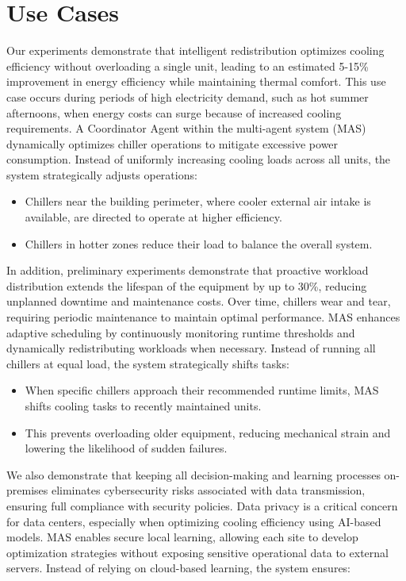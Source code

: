 \documentclass{svproc}
\begin{document}
\section{Use Cases}
\label{sec:use-cases}

Our experiments demonstrate that intelligent redistribution optimizes cooling efficiency without overloading a single unit, leading to an estimated 5-15\% improvement in energy efficiency while maintaining thermal comfort. This use case occurs during periods of high electricity demand, such as hot summer afternoons, when energy costs can surge because of increased cooling requirements. A Coordinator Agent within the multi-agent system (MAS) dynamically optimizes chiller operations to mitigate excessive power consumption. Instead of uniformly increasing cooling loads across all units, the system strategically adjusts operations:

\begin{itemize}
\item Chillers near the building perimeter, where cooler external air intake is available, are directed to operate at higher efficiency.
\item Chillers in hotter zones reduce their load to balance the overall system.
\end{itemize}

In addition, preliminary experiments demonstrate that proactive workload distribution extends the lifespan of the equipment by up to 30\%, reducing unplanned downtime and maintenance costs. Over time, chillers wear and tear, requiring periodic maintenance to maintain optimal performance. MAS enhances adaptive scheduling by continuously monitoring runtime thresholds and dynamically redistributing workloads when necessary. Instead of running all chillers at equal load, the system strategically shifts tasks:

\begin{itemize} 
\item When specific chillers approach their recommended runtime limits, MAS shifts cooling tasks to recently maintained units.
\item This prevents overloading older equipment, reducing mechanical strain and lowering the likelihood of sudden failures.
\end{itemize}

We also demonstrate that keeping all decision-making and learning processes on-premises eliminates cybersecurity risks associated with data transmission, ensuring full compliance with security policies. Data privacy is a critical concern for data centers, especially when optimizing cooling efficiency using AI-based models. MAS enables secure local learning, allowing each site to develop optimization strategies without exposing sensitive operational data to external servers. Instead of relying on cloud-based learning, the system ensures:
\end{document}
